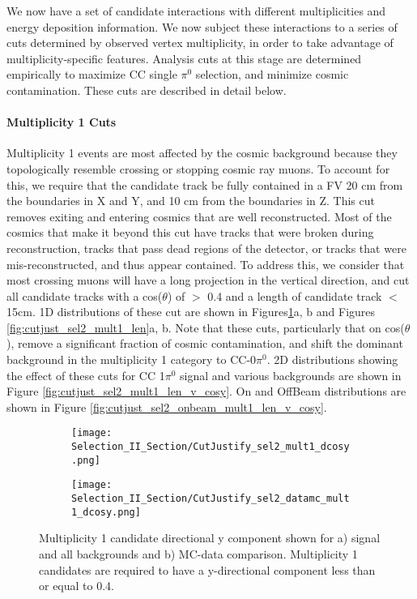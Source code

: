 We now have a set of candidate interactions with different multiplicities and energy deposition information.  We now subject these interactions to a series of cuts determined by observed vertex multiplicity, in order to take advantage of multiplicity-specific features. Analysis cuts at this stage are determined empirically to maximize CC single $\pi^0$ selection, and minimize cosmic contamination. These cuts are described in detail below.
\clearpage
\paragraph{Multiplicity 1 Cuts}
Multiplicity 1 events are most affected by the cosmic background because they topologically resemble crossing or stopping cosmic ray muons. To account for this, we require that the candidate track be fully contained in a FV 20 cm from the boundaries in X and Y, and 10 cm from the boundaries in Z. This cut removes exiting and entering cosmics that are well reconstructed. Most of the cosmics that make it beyond this cut have tracks that were broken during reconstruction, tracks that pass dead regions of the detector, or tracks that were mis-reconstructed, and thus appear contained. To address this, we consider that most crossing muons will have a long projection in the vertical direction, and cut all candidate tracks with a cos($\theta$) of $>$ 0.4 and a length of candidate track $<$ 15cm. 1D distributions of these cut are shown in Figures\ref{fig:cutjust_sel2_mult1_cosy}a, b and Figures \ref{fig:cutjust_sel2_mult1_len}a, b. Note that these cuts, particularly that on cos($\theta$), remove a significant fraction of cosmic contamination, and shift the dominant background in the multiplicity 1 category to CC-0$\pi^0$. 2D distributions showing the effect of these cuts for CC 1$\pi^0$ signal and various backgrounds are shown in Figure \ref{fig:cutjust_sel2_mult1_len_v_cosy}. On and OffBeam distributions are shown in Figure \ref{fig:cutjust_sel2_onbeam_mult1_len_v_cosy}. 

\begin{figure}[H]
\centering
  \begin{subfigure}[t]{0.4\textwidth}
    \centering
\texttt{[image: Selection\_II\_Section/CutJustify\_sel2\_mult1\_dcosy.png]}
    \caption{ }
  \end{subfigure} 
  \hspace{20mm}
  \begin{subfigure}[t]{0.4\textwidth}
    \centering
\texttt{[image: Selection\_II\_Section/CutJustify\_sel2\_datamc\_mult1\_dcosy.png]}
    \caption{ }
  \end{subfigure} 
\caption{Multiplicity 1 candidate directional y component shown for a) signal and all backgrounds and b) MC-data comparison.  Multiplicity 1 candidates are required to have a y-directional component less than or equal to 0.4. }
\label{fig:cutjust_sel2_mult1_cosy}
\end{figure}

